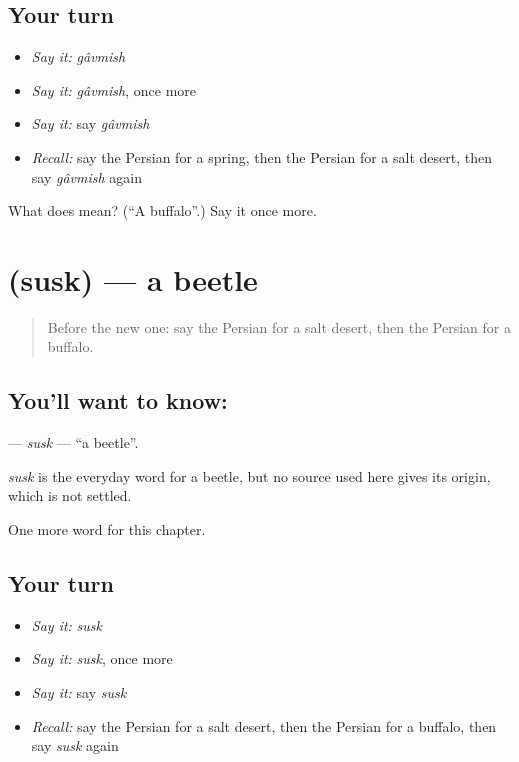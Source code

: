 \subsection*{Your turn}
\begin{itemize}
\raggedright
  \item \emph{Say it:} \emph{gâvmish}
  \item \emph{Say it:} \emph{gâvmish}, once more
  \item \emph{Say it:} say \emph{gâvmish}
  \item \emph{Recall:} say the Persian for a spring, then the Persian for a salt desert, then say \emph{gâvmish} again
\end{itemize}

\begin{tcolorbox}[breakable,colback=teal!4,colframe=teal!35!black,title={Before you move on}]
What does  mean? (\textquotedblleft{}A buffalo\textquotedblright{}.) Say it once more.
\end{tcolorbox}
\section[\texorpdfstring{\fa{سوسک} (susk)}{سوسک (susk)}]{ (susk) — a beetle}

\label{lesson:FA-C121-susk}



\begin{quote}
Before the new one: say the Persian for a salt desert, then the Persian for a buffalo.
\end{quote}

\subsection*{You'll want to know: }
\textbf{} — \emph{susk} — \textquotedblleft{}a beetle\textquotedblright{}.

\begin{cousinweb}
\emph{susk} is the everyday word for a beetle, but no source used here gives its origin, which is not settled.
\end{cousinweb}

\begin{grammarlens}[title={What you've built}]
One more word for this chapter.
\end{grammarlens}

\subsection*{Your turn}
\begin{itemize}
\raggedright
  \item \emph{Say it:} \emph{susk}
  \item \emph{Say it:} \emph{susk}, once more
  \item \emph{Say it:} say \emph{susk}
  \item \emph{Recall:} say the Persian for a salt desert, then the Persian for a buffalo, then say \emph{susk} again
\end{itemize}

